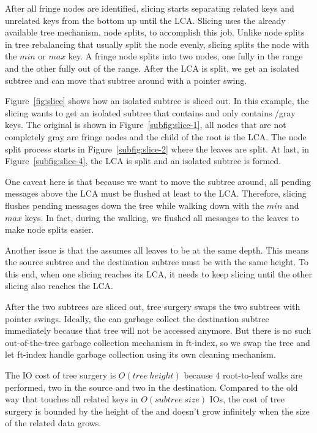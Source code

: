 After all fringe nodes are identified, slicing starts separating related keys
and unrelated keys from the bottom up until the LCA.
Slicing uses the already available tree mechanism, node splits, to accomplish
this job.
Unlike node splits in tree rebalancing that usually split the node evenly,
slicing splits the node with the $min$ or $max$ key.
A fringe node splits into two nodes, one fully in the range and the other fully
out of the range.
After the LCA is split, we get an isolated subtree and can move that subtree
around with a pointer swing.

Figure~\ref{fig:slice} shows how an isolated subtree is sliced out.
In this example, the slicing wants to get an isolated subtree that contains and
only contains /gray keys.
The original \bet is shown in Figure~\ref{subfig:slice-1}, all nodes that are
not completely gray are fringe nodes and the child of the root is the LCA.
The node split process starts in Figure~\ref{subfig:slice-2} where the leaves
are split.
At last, in Figure~\ref{subfig:slice-4}, the LCA is split and an isolated
subtree is formed.

One caveat here is that because we want to move the subtree around, all pending
messages above the LCA must be flushed at least to the LCA.
Therefore, slicing flushes pending messages down the tree while walking down
with the $min$ and $max$ keys.
In fact, during the walking, we flushed all messages to the leaves to make
node splits easier.

Another issue is that the \bet assumes all leaves to be at the same depth.
This means the source subtree and the destination subtree must be with the same
height.
To this end, when one slicing reaches its LCA, it needs to keep slicing until
the other slicing also reaches the LCA.

After the two subtrees are sliced out, tree surgery swaps the two subtrees with
pointer swings.
Ideally, the \bet can garbage collect the destination subtree immediately
because that tree will not be accessed anymore.
But there is no such out-of-the-tree garbage collection mechanism in
ft-index, so we swap the tree and let ft-index handle garbage
collection using its own cleaning mechanism.

The IO cost of tree surgery is $O(tree\ height)$ because 4 root-to-leaf walks
are performed, two in the source and two in the destination.
Compared to the old way that touches all related keys in $O(subtree\ size)$ IOs,
the cost of tree surgery is bounded by the height of the \bet and doesn't
grow infinitely when the size of the related data grows.

